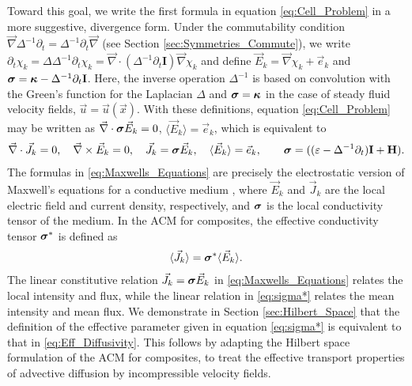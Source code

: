 \documentclass[11pt]{amsart}
\newcommand{\Hb}{\mathbf{H}}
\newcommand{\Ib}{\mathbf{I}}
\newcommand\bsig{\mbox{\boldmath${\sigma}$}}
\newcommand\bkappa{\mbox{\boldmath${\kappa}$}}
\begin{document}
Toward this goal, we write the first formula in equation
\eqref{eq:Cell_Problem} in a more suggestive, divergence
form. Under the commutability condition
$\vec{\nabla}\Delta^{-1}\partial_t=\Delta^{-1}\partial_t\vec{\nabla}$ (see Section
\ref{sec:Symmetries_Commute}), we write
\cite{Fannjiang:SIAM_JAM:333}  
$\partial_t\chi_k=\Delta\Delta^{-1}\partial_t\chi_k=\vec{\nabla}\cdot(\Delta^{-1}\partial_t\Ib)\vec{\nabla}\chi_k$ and define
$\vec{E}_k=\vec{\nabla}\chi_k+\vec{e}_k$ and $\bsig=\bkappa-\Delta^{-1}\partial_t\Ib
$. Here, the inverse operation $\Delta^{-1}$ is based on convolution with
the Green's function for the Laplacian $\Delta$ and $\bsig=\bkappa$ in the
case of steady fluid velocity fields, $\vec{u}=\vec{u}(\vec{x})$. 
With these definitions, equation \eqref{eq:Cell_Problem} may be
written as $\vec{\nabla}\cdot\bsig\vec{E}_k=0$, $\langle\vec{E}_k\rangle=\vec{e}_k$, which
is equivalent to  
%
\begin{align}\label{eq:Maxwells_Equations}    
  \vec{\nabla}\cdot\vec{J}_k=0, \quad
  \vec{\nabla}\times\vec{E}_k=0, \quad
  \vec{J}_k=\bsig\vec{E}_k,\quad
  \langle\vec{E}_k\rangle=\vec{e}_k,\qquad
  \bsig%
       =((\varepsilon-\Delta^{-1}\partial_t)\Ib+\Hb).
\end{align}
%
The formulas in
\eqref{eq:Maxwells_Equations} are  
precisely the electrostatic version of Maxwell's equations for a
conductive medium \cite{Golden:CMP-473}, where $\vec{E}_k$ and
$\vec{J}_k$ are the local electric field and current density,
respectively, and $\bsig$ is the local conductivity tensor of the
medium. In the ACM for composites, the effective conductivity tensor
$\bsig^*$ is defined as
% 
\begin{align}\label{eq:sigma*}
  \langle\vec{J}_k\rangle=\bsig^*\langle\vec{E}_k\rangle.
\end{align}
%
The linear constitutive relation $\vec{J}_k=\bsig\vec{E}_k$ in
\eqref{eq:Maxwells_Equations} relates the local intensity and flux,
while the linear relation in \eqref{eq:sigma*} relates the mean
intensity and mean flux. We demonstrate in Section
\ref{sec:Hilbert_Space} that the definition of the effective parameter
given in equation \eqref{eq:sigma*} is equivalent to that in
\eqref{eq:Eff_Diffusivity}. This follows by adapting the Hilbert space
formulation of the ACM for composites, to treat the effective
transport properties of advective diffusion by incompressible velocity
fields.       
\end{document}
